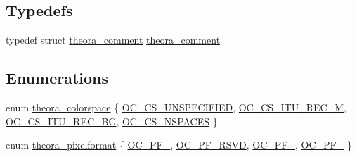 \subsection*{Typedefs}
\begin{DoxyCompactItemize}
\item 
typedef struct \hyperlink{structtheora__comment}{theora\+\_\+comment} \hyperlink{group__oldfuncs_gaa504e8a56a4bf9c8e44f77d05aef0bb5}{theora\+\_\+comment}
\end{DoxyCompactItemize}
\subsection*{Enumerations}
\begin{DoxyCompactItemize}
\item 
enum \hyperlink{group__oldfuncs_gaa567da4ce591f7373149ce3ef3acdac9}{theora\+\_\+colorspace} \{ \hyperlink{group__oldfuncs_ggaa567da4ce591f7373149ce3ef3acdac9abf217cf83d7d7cbf73295e6689f5cf5f}{O\+C\+\_\+\+C\+S\+\_\+\+U\+N\+S\+P\+E\+C\+I\+F\+I\+E\+D}, 
\hyperlink{group__oldfuncs_ggaa567da4ce591f7373149ce3ef3acdac9ab20c9851a21ab148fef0bf2c00c0a294}{O\+C\+\_\+\+C\+S\+\_\+\+I\+T\+U\+\_\+\+R\+E\+C\+\_\+M}, 
\hyperlink{group__oldfuncs_ggaa567da4ce591f7373149ce3ef3acdac9a04f8fa2da26f9ec513f514163705666a}{O\+C\+\_\+\+C\+S\+\_\+\+I\+T\+U\+\_\+\+R\+E\+C\+\_\+B\+G}, 
\hyperlink{group__oldfuncs_ggaa567da4ce591f7373149ce3ef3acdac9a640b572f11fa7102d434e1c605aaa186}{O\+C\+\_\+\+C\+S\+\_\+\+N\+S\+P\+A\+C\+E\+S}
 \}
\item 
enum \hyperlink{group__oldfuncs_gae169da05bfaaf4e964a6866552d45079}{theora\+\_\+pixelformat} \{ \hyperlink{group__oldfuncs_ggae169da05bfaaf4e964a6866552d45079a4e451af01be2645511b0e431f5225d2b}{O\+C\+\_\+\+P\+F\+\_}, 
\hyperlink{group__oldfuncs_ggae169da05bfaaf4e964a6866552d45079a7d21c63341ad299766839c83ed1216eb}{O\+C\+\_\+\+P\+F\+\_\+\+R\+S\+V\+D}, 
\hyperlink{group__oldfuncs_ggae169da05bfaaf4e964a6866552d45079a36a88c55b7ddd5aedeac2d61d57fee5b}{O\+C\+\_\+\+P\+F\+\_}, 
\hyperlink{group__oldfuncs_ggae169da05bfaaf4e964a6866552d45079a1d5c6d1b0365e06b4a87880b7825f044}{O\+C\+\_\+\+P\+F\+\_}
 \}
\end{DoxyCompactItemize}

